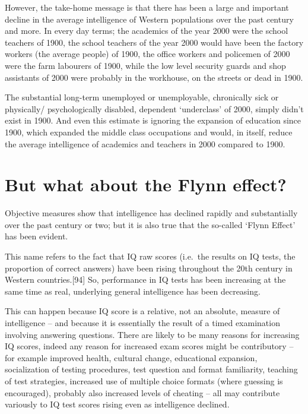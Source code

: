 \documentclass[
]{book}
\begin{document}
However, the take-home message is that there has been a large and important decline in the average intelligence of Western populations over the past century and more. In every day terms; the academics of the year 2000 were the school teachers of 1900, the school teachers of the year 2000 would have been the factory workers (the average people) of 1900, the office workers and policemen of 2000 were the farm labourers of 1900, while the low level security guards and shop assistants of 2000 were probably in the workhouse, on the streets or dead in 1900.

The substantial long-term unemployed or unemployable, chronically sick or physically/ psychologically disabled, dependent `underclass' of 2000, simply didn't exist in 1900. And even this estimate is ignoring the expansion of education since 1900, which expanded the middle class occupations and would, in itself, reduce the average intelligence of academics and teachers in 2000 compared to 1900.

\hypertarget{but-what-about-the-flynn-effect}{%
\section{But what about the Flynn effect?}\label{but-what-about-the-flynn-effect}}

Objective measures show that intelligence has declined rapidly and substantially over the past century or two; but it is also true that the so-called `Flynn Effect' has been evident.

This name refers to the fact that IQ raw scores (i.e.~the results on IQ tests, the proportion of correct answers) have been rising throughout the 20th century in Western countries.{[}94{]} So, performance in IQ tests has been increasing at the same time as real, underlying general intelligence has been decreasing.

This can happen because IQ score is a relative, not an absolute, measure of intelligence -- and because it is essentially the result of a timed examination involving answering questions. There are likely to be many reasons for increasing IQ scores, indeed any reason for increased exam scores might be contributory -- for example improved health, cultural change, educational expansion, socialization of testing procedures, test question and format familiarity, teaching of test strategies, increased use of multiple choice formats (where guessing is encouraged), probably also increased levels of cheating -- all may contribute variously to IQ test scores rising even as intelligence declined.
\end{document}
